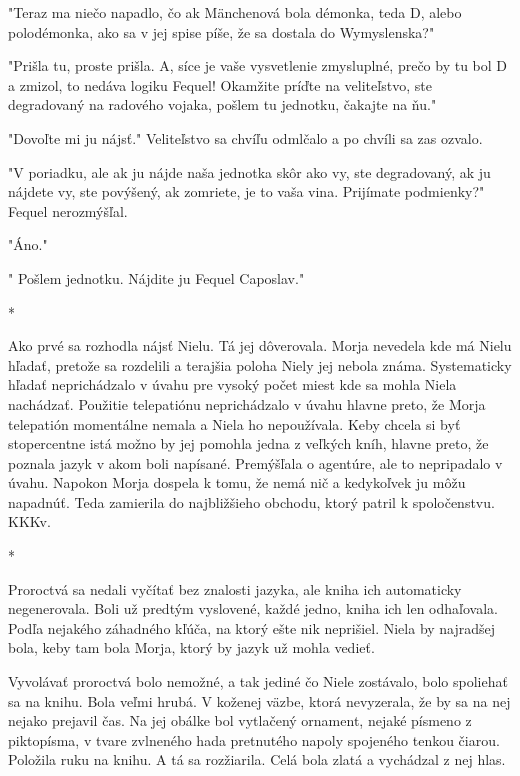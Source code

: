 \documentclass{book}
\begin{document}
"$ $Teraz ma niečo napadlo, čo ak Mänchenová bola démonka, teda D, alebo polodémonka, ako sa v jej spise píše, že sa dostala do Wymyslenska?"$ $ 

"$ $Prišla tu, proste prišla. A, síce je vaše vysvetlenie zmysluplné, prečo by tu bol D a zmizol, to nedáva logiku Fequel! Okamžite príďte na veliteľstvo, ste degradovaný na radového vojaka, pošlem tu jednotku, čakajte na ňu."$ $ 

"$ $Dovoľte mi ju nájsť."$ $  Veliteľstvo sa chvíľu odmlčalo a po chvíli sa zas ozvalo.

"$ $V poriadku, ale ak ju nájde naša jednotka skôr ako vy, ste degradovaný, ak ju nájdete vy, ste povýšený, ak zomriete, je to vaša vina. Prijímate podmienky?"$ $  Fequel nerozmýšľal.

"$ $Áno."$ $ 

"$ $ Pošlem jednotku. Nájdite ju Fequel Caposlav."$ $ 

\begin{center}

*

\end{center}

Ako prvé sa rozhodla nájsť Nielu. Tá jej dôverovala. Morja nevedela kde má Nielu hľadať, pretože sa rozdelili a terajšia poloha Niely jej nebola známa. Systematicky hľadať neprichádzalo v úvahu pre vysoký počet miest kde sa mohla Niela nachádzať. Použitie telepatiónu neprichádzalo v úvahu hlavne preto, že Morja telepatión momentálne nemala a Niela ho nepoužívala. Keby chcela si byť stopercentne istá možno by jej pomohla jedna z veľkých kníh, hlavne preto, že poznala jazyk v akom boli napísané. Premýšľala o agentúre, ale to nepripadalo v úvahu. Napokon Morja dospela k tomu, že nemá nič a kedykoľvek ju môžu napadnúť. Teda zamierila do najbližšieho obchodu, ktorý patril k spoločenstvu. KKKv.

\begin{center}

*

\end{center}

Proroctvá sa nedali vyčítať bez znalosti jazyka, ale kniha ich automaticky negenerovala. Boli už predtým vyslovené, každé jedno, kniha ich len odhaľovala. Podľa nejakého záhadného kľúča, na ktorý ešte nik neprišiel. Niela by najradšej bola, keby tam bola Morja, ktorý by jazyk už mohla vedieť.

Vyvolávať proroctvá bolo nemožné, a tak jediné čo Niele zostávalo, bolo spoliehať sa na knihu. Bola veľmi hrubá. V koženej väzbe, ktorá nevyzerala, že by sa na nej nejako prejavil čas. Na jej obálke bol vytlačený ornament, nejaké písmeno z piktopísma, v tvare zvlneného hada pretnutého napoly spojeného tenkou čiarou. Položila ruku na knihu. A tá sa rozžiarila. Celá bola zlatá a vychádzal z nej hlas.
\end{document}
